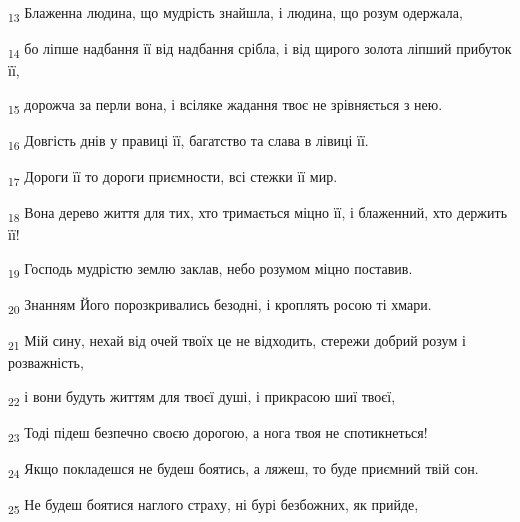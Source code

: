 \begin{tcolorbox}
\textsubscript{13} Блаженна людина, що мудрість знайшла, і людина, що розум одержала,
\end{tcolorbox}
\begin{tcolorbox}
\textsubscript{14} бо ліпше надбання її від надбання срібла, і від щирого золота ліпший прибуток її,
\end{tcolorbox}
\begin{tcolorbox}
\textsubscript{15} дорожча за перли вона, і всіляке жадання твоє не зрівняється з нею.
\end{tcolorbox}
\begin{tcolorbox}
\textsubscript{16} Довгість днів у правиці її, багатство та слава в лівиці її.
\end{tcolorbox}
\begin{tcolorbox}
\textsubscript{17} Дороги її то дороги приємности, всі стежки її мир.
\end{tcolorbox}
\begin{tcolorbox}
\textsubscript{18} Вона дерево життя для тих, хто тримається міцно її, і блаженний, хто держить її!
\end{tcolorbox}
\begin{tcolorbox}
\textsubscript{19} Господь мудрістю землю заклав, небо розумом міцно поставив.
\end{tcolorbox}
\begin{tcolorbox}
\textsubscript{20} Знанням Його порозкривались безодні, і кроплять росою ті хмари.
\end{tcolorbox}
\begin{tcolorbox}
\textsubscript{21} Мій сину, нехай від очей твоїх це не відходить, стережи добрий розум і розважність,
\end{tcolorbox}
\begin{tcolorbox}
\textsubscript{22} і вони будуть життям для твоєї душі, і прикрасою шиї твоєї,
\end{tcolorbox}
\begin{tcolorbox}
\textsubscript{23} Тоді підеш безпечно своєю дорогою, а нога твоя не спотикнеться!
\end{tcolorbox}
\begin{tcolorbox}
\textsubscript{24} Якщо покладешся не будеш боятись, а ляжеш, то буде приємний твій сон.
\end{tcolorbox}
\begin{tcolorbox}
\textsubscript{25} Не будеш боятися наглого страху, ні бурі безбожних, як прийде,
\end{tcolorbox}
